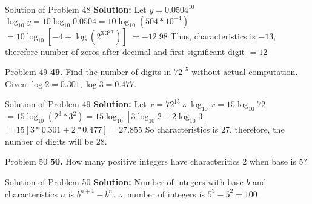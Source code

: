 \documentclass[aspectratio=1610,8pt]{beamer}
\begin{document}
\begin{frame}{Solution of Problem 48}
  \textbf{Solution:} Let $y = 0.0504^{10}$
  \linebreak\linebreak
  $\log_{10}y = 10\log_{10}0.0504 = 10\log_{10}(504*10^{-4})$
  \linebreak\linebreak
  $= 10\log_{10}[-4 + \log(2^3.3^2.7)]$
  \linebreak\linebreak
  $= -12.98$
  \linebreak\linebreak
  Thus, characteristics is $-13,$ therefore number of zeros after decimal and first significant digit $= 12$
\end{frame}
\begin{frame}{Problem 49}
  \textbf{49.} Find the number of digits in $72^{15}$ without actual computation. Given $\log 2 = 0.301, \log 3 = 0.477.$
\end{frame}
\begin{frame}{Solution of Problem 49}
  \textbf{Solution:} Let $x = 72^{15}~\therefore~ \log_{10}x = 15\log_{10}72$
  \linebreak\linebreak
  $= 15\log_{10}(2^3*3^2) = 15\log_{10}[3\log_{10}2 + 2\log_{10}3]$
  \linebreak\linebreak
  $= 15[3*0.301 + 2*0.477] = 27.855$
  \linebreak\linebreak
  So characteristics is $27$, therefore, the number of digits will be $28.$
\end{frame}
\begin{frame}{Problem 50}
  \textbf{50.} How many positive integers have characteritics $2$ when base is $5?$
\end{frame}
\begin{frame}{Solution of Problem 50}
  \textbf{Solution:} Number of integers with base $b$ and characteristics $n$ is $b^{n + 1} - b^n.$
  \linebreak\linebreak
  $\therefore ~$ number of integers is $5^3 - 5^2 = 100$
\end{frame}
\end{document}
